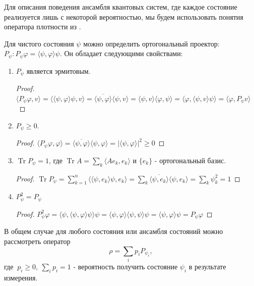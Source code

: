 \documentclass[%
master,         %
subf,           %
href,           %
,times         %
]{disser}
\DeclareMathOperator{\Tr}{Tr}
\numberwithin{equation}{section}
\numberwithin{figure}{section}
\begin{document}
Для описания поведения ансамбля квантовых систем, где каждое состояние реализуется лишь с некоторой вероятностью, мы будем использовать понятия оператора плотности из \cite{Khrennikov_information}.

Для чистого состояния $\psi$ можно определить ортогональный проектор: $P_\psi: P_\psi\varphi = \langle \psi, \varphi \rangle \psi$. Он обладает следующими свойствами:
\begin{enumerate}
\item $P_\psi$ является эрмитовым. 
\begin{proof}
$\langle P_\psi\varphi, v\rangle = \langle \langle\psi,\varphi\rangle \psi, v\rangle = \overline{\langle\psi,\varphi\rangle} \langle\psi, v\rangle = \langle\psi, v\rangle \langle\varphi,\psi\rangle  = \langle\varphi, \langle\psi, v\rangle\psi\rangle = \langle\varphi, P_\psi v \rangle$
\end{proof}
\item $P_\psi \geq 0$.
\begin{proof}
$\langle P_\psi\varphi, \varphi\rangle = \overline{\langle\psi,\varphi\rangle} \langle\psi, \varphi\rangle = |\langle\psi, \varphi\rangle|^2 \geq 0$
\end{proof}
\item $\Tr P_\psi = 1$, где $\Tr A = \sum_k \langle Ae_k, e_k\rangle$ и $\{e_k\}$  - ортогональный базис.
\begin{proof}
$\Tr P_\psi = \sum_{k = 1}^n \langle \langle \psi, e_k\rangle\psi, e_k\rangle = \sum_k \overline{\langle\psi, e_k\rangle}\langle\psi, e_k\rangle = \sum_k\psi_k^2 = 1$
\end{proof}
\item $P_\psi^2 = P_\psi$
\begin{proof}
$P_\psi^2\varphi = \langle\psi, \langle\psi, \varphi\rangle \psi\rangle \psi = \langle\psi, \varphi\rangle \langle\psi, \psi\rangle\psi = \langle\psi, \varphi\rangle\psi = P_\psi\varphi $
\end{proof}
\end{enumerate}
В общем случае для любого состояния или ансамбля состояний можно рассмотреть оператор
\[
\rho = \sum_ip_iP_{\psi_i},
\]
где $\ p_i \geq 0,\ \sum_i p_i = 1$  - вероятность получить состояние $\psi_i$ в результате измерения.
\end{document}
